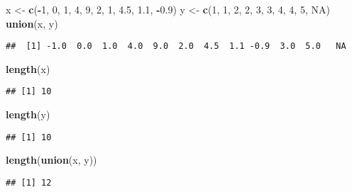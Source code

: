 \documentclass[]{article}
\newenvironment{Shaded}{\begin{snugshade}}{\end{snugshade}}
\newcommand{\KeywordTok}[1]{\textcolor[rgb]{0.13,0.29,0.53}{\textbf{#1}}}
\newcommand{\DecValTok}[1]{\textcolor[rgb]{0.00,0.00,0.81}{#1}}
\newcommand{\FloatTok}[1]{\textcolor[rgb]{0.00,0.00,0.81}{#1}}
\newcommand{\StringTok}[1]{\textcolor[rgb]{0.31,0.60,0.02}{#1}}
\newcommand{\OtherTok}[1]{\textcolor[rgb]{0.56,0.35,0.01}{#1}}
\newcommand{\OperatorTok}[1]{\textcolor[rgb]{0.81,0.36,0.00}{\textbf{#1}}}
\newcommand{\NormalTok}[1]{#1}
\begin{document}
\begin{Shaded}
\begin{Highlighting}[]
\NormalTok{x <-}\StringTok{ }\KeywordTok{c}\NormalTok{(}\OperatorTok{-}\DecValTok{1}\NormalTok{, }\DecValTok{0}\NormalTok{, }\DecValTok{1}\NormalTok{, }\DecValTok{4}\NormalTok{, }\DecValTok{9}\NormalTok{, }\DecValTok{2}\NormalTok{, }\DecValTok{1}\NormalTok{, }\FloatTok{4.5}\NormalTok{, }\FloatTok{1.1}\NormalTok{, }\OperatorTok{-}\FloatTok{0.9}\NormalTok{)}
\NormalTok{y <-}\StringTok{ }\KeywordTok{c}\NormalTok{(}\DecValTok{1}\NormalTok{, }\DecValTok{1}\NormalTok{, }\DecValTok{2}\NormalTok{, }\DecValTok{2}\NormalTok{, }\DecValTok{3}\NormalTok{, }\DecValTok{3}\NormalTok{, }\DecValTok{4}\NormalTok{, }\DecValTok{4}\NormalTok{, }\DecValTok{5}\NormalTok{, }\OtherTok{NA}\NormalTok{)}
\KeywordTok{union}\NormalTok{(x, y)}
\end{Highlighting}
\end{Shaded}

\begin{verbatim}
##  [1] -1.0  0.0  1.0  4.0  9.0  2.0  4.5  1.1 -0.9  3.0  5.0   NA
\end{verbatim}

\begin{Shaded}
\begin{Highlighting}[]
\KeywordTok{length}\NormalTok{(x)}
\end{Highlighting}
\end{Shaded}

\begin{verbatim}
## [1] 10
\end{verbatim}

\begin{Shaded}
\begin{Highlighting}[]
\KeywordTok{length}\NormalTok{(y)}
\end{Highlighting}
\end{Shaded}

\begin{verbatim}
## [1] 10
\end{verbatim}

\begin{Shaded}
\begin{Highlighting}[]
\KeywordTok{length}\NormalTok{(}\KeywordTok{union}\NormalTok{(x, y))}
\end{Highlighting}
\end{Shaded}

\begin{verbatim}
## [1] 12
\end{verbatim}
\end{document}
